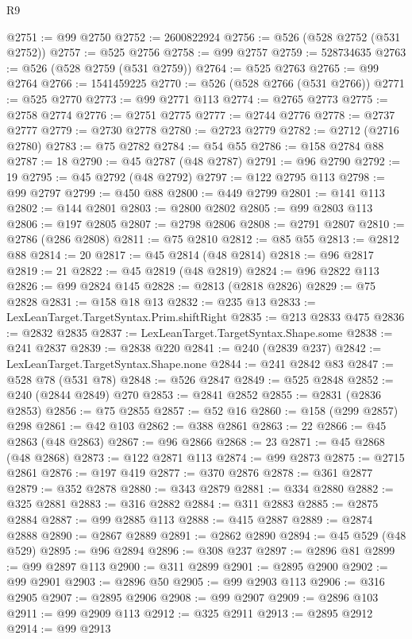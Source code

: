 \begin{lexlean}{R9}
\begin{coremodule}
@2751 := @99 @2750
@2752 := 2600822924
@2756 := @526 (@528 @2752 (@531 @2752))
@2757 := @525 @2756
@2758 := @99 @2757
@2759 := 528734635
@2763 := @526 (@528 @2759 (@531 @2759))
@2764 := @525 @2763
@2765 := @99 @2764
@2766 := 1541459225
@2770 := @526 (@528 @2766 (@531 @2766))
@2771 := @525 @2770
@2773 := @99 @2771 @113
@2774 := @2765 @2773
@2775 := @2758 @2774
@2776 := @2751 @2775
@2777 := @2744 @2776
@2778 := @2737 @2777
@2779 := @2730 @2778
@2780 := @2723 @2779
@2782 := @2712 (@2716 @2780)
@2783 := @75 @2782
@2784 := @54 @55
@2786 := @158 @2784 @88
@2787 := 18
@2790 := @45 @2787 (@48 @2787)
@2791 := @96 @2790
@2792 := 19
@2795 := @45 @2792 (@48 @2792)
@2797 := @122 @2795 @113
@2798 := @99 @2797
@2799 := @450 @88
@2800 := @449 @2799
@2801 := @141 @113
@2802 := @144 @2801
@2803 := @2800 @2802
@2805 := @99 @2803 @113
@2806 := @197 @2805
@2807 := @2798 @2806
@2808 := @2791 @2807
@2810 := @2786 (@286 @2808)
@2811 := @75 @2810
@2812 := @85 @55
@2813 := @2812 @88
@2814 := 20
@2817 := @45 @2814 (@48 @2814)
@2818 := @96 @2817
@2819 := 21
@2822 := @45 @2819 (@48 @2819)
@2824 := @96 @2822 @113
@2826 := @99 @2824 @145
@2828 := @2813 (@2818 @2826)
@2829 := @75 @2828
@2831 := @158 @18 @13
@2832 := @235 @13
@2833 := LexLeanTarget.TargetSyntax.Prim.shiftRight
@2835 := @213 @2833 @475
@2836 := @2832 @2835
@2837 := LexLeanTarget.TargetSyntax.Shape.some
@2838 := @241 @2837
@2839 := @2838 @220
@2841 := @240 (@2839 @237)
@2842 := LexLeanTarget.TargetSyntax.Shape.none
@2844 := @241 @2842 @83
@2847 := @528 @78 (@531 @78)
@2848 := @526 @2847
@2849 := @525 @2848
@2852 := @240 (@2844 @2849) @270
@2853 := @2841 @2852
@2855 := @2831 (@2836 @2853)
@2856 := @75 @2855
@2857 := @52 @16
@2860 := @158 (@299 @2857) @298
@2861 := @42 @103
@2862 := @388 @2861
@2863 := 22
@2866 := @45 @2863 (@48 @2863)
@2867 := @96 @2866
@2868 := 23
@2871 := @45 @2868 (@48 @2868)
@2873 := @122 @2871 @113
@2874 := @99 @2873
@2875 := @2715 @2861
@2876 := @197 @419
@2877 := @370 @2876
@2878 := @361 @2877
@2879 := @352 @2878
@2880 := @343 @2879
@2881 := @334 @2880
@2882 := @325 @2881
@2883 := @316 @2882
@2884 := @311 @2883
@2885 := @2875 @2884
@2887 := @99 @2885 @113
@2888 := @415 @2887
@2889 := @2874 @2888
@2890 := @2867 @2889
@2891 := @2862 @2890
@2894 := @45 @529 (@48 @529)
@2895 := @96 @2894
@2896 := @308 @237
@2897 := @2896 @81
@2899 := @99 @2897 @113
@2900 := @311 @2899
@2901 := @2895 @2900
@2902 := @99 @2901
@2903 := @2896 @50
@2905 := @99 @2903 @113
@2906 := @316 @2905
@2907 := @2895 @2906
@2908 := @99 @2907
@2909 := @2896 @103
@2911 := @99 @2909 @113
@2912 := @325 @2911
@2913 := @2895 @2912
@2914 := @99 @2913

\end{coremodule}
\end{lexlean}
